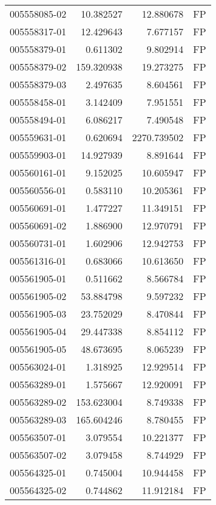 \begin{tabular}{lrrl}
005558085-02 &   10.382527 &      12.880678 &   FP \\
005558317-01 &   12.429643 &       7.677157 &   FP \\
005558379-01 &    0.611302 &       9.802914 &   FP \\
005558379-02 &  159.320938 &      19.273275 &   FP \\
005558379-03 &    2.497635 &       8.604561 &   FP \\
005558458-01 &    3.142409 &       7.951551 &   FP \\
005558494-01 &    6.086217 &       7.490548 &   FP \\
005559631-01 &    0.620694 &    2270.739502 &   FP \\
005559903-01 &   14.927939 &       8.891644 &   FP \\
005560161-01 &    9.152025 &      10.605947 &   FP \\
005560556-01 &    0.583110 &      10.205361 &   FP \\
005560691-01 &    1.477227 &      11.349151 &   FP \\
005560691-02 &    1.886900 &      12.970791 &   FP \\
005560731-01 &    1.602906 &      12.942753 &   FP \\
005561316-01 &    0.683066 &      10.613650 &   FP \\
005561905-01 &    0.511662 &       8.566784 &   FP \\
005561905-02 &   53.884798 &       9.597232 &   FP \\
005561905-03 &   23.752029 &       8.470844 &   FP \\
005561905-04 &   29.447338 &       8.854112 &   FP \\
005561905-05 &   48.673695 &       8.065239 &   FP \\
005563024-01 &    1.318925 &      12.929514 &   FP \\
005563289-01 &    1.575667 &      12.920091 &   FP \\
005563289-02 &  153.623004 &       8.749338 &   FP \\
005563289-03 &  165.604246 &       8.780455 &   FP \\
005563507-01 &    3.079554 &      10.221377 &   FP \\
005563507-02 &    3.079458 &       8.744929 &   FP \\
005564325-01 &    0.745004 &      10.944458 &   FP \\
005564325-02 &    0.744862 &      11.912184 &   FP \\

\end{tabular}
